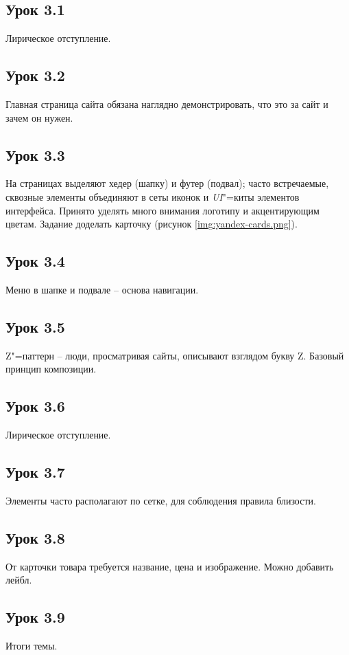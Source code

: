 \documentclass[variant=practice]{bsuir}
\begin{document}
\subsection{Урок 3.1} Лирическое отступление.

\subsection{Урок 3.2} Главная страница сайта обязана наглядно демонстрировать,
что это за сайт и зачем он нужен.

\subsection{Урок 3.3} На страницах выделяют хедер (шапку) и футер (подвал);
часто встречаемые, сквозные элементы объединяют в сеты иконок и
\textit{UI}"=киты элементов интерфейса. Принято уделять много внимания логотипу
и акцентирующим цветам. Задание доделать карточку (рисунок
\ref{img:yandex-cards.png}).

\subsection{Урок 3.4} Меню в шапке и подвале -- основа навигации.

\subsection{Урок 3.5} Z"=паттерн -- люди, просматривая сайты, описывают взглядом
букву Z. Базовый принцип композиции.


\subsection{Урок 3.6} Лирическое отступление.

\subsection{Урок 3.7} Элементы часто располагают по сетке, для соблюдения
правила близости.

\subsection{Урок 3.8} От карточки товара требуется название, цена и изображение.
Можно добавить лейбл.

\subsection{Урок 3.9} Итоги темы.
\end{document}
